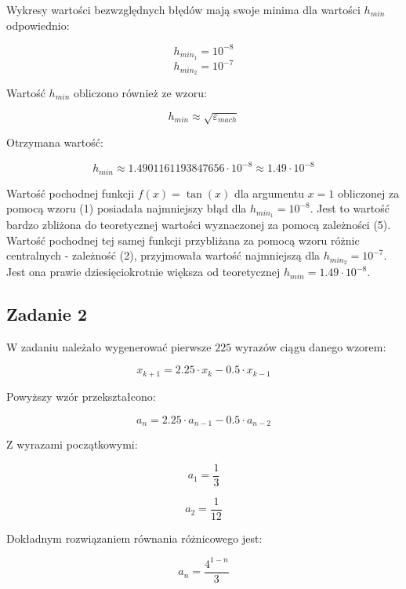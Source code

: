 \documentclass{article}
\begin{document}
	Wykresy wartości bezwzględnych błędów mają swoje minima dla wartości $h_{min}$ odpowiednio:
	
	$$h_{min_1} = 10^{-8}$$
	$$h_{min_2} = 10^{-7}$$
	
	Wartość $h_{min}$ obliczono również ze wzoru:
	
	\begin{equation}
		h_{min} \approx \sqrt{\varepsilon_{mach}}
	\end{equation}
	
	Otrzymana wartość:
	
	$$h_{min} \approx 1.4901161193847656 \cdot 10^{-8} \approx 1.49 \cdot 10^{-8}$$
	
	Wartość pochodnej funkcji $f(x) = \tan (x)$ dla argumentu $x = 1$ obliczonej za pomocą wzoru (1) posiadała najmniejszy błąd dla $h_{min_1} = 10^{-8}$. Jest to wartość bardzo zbliżona do teoretycznej wartości wyznaczonej za pomocą zależności (5). \newline \newline
	Wartość pochodnej tej samej funkcji przybliżana za pomocą wzoru różnic centralnych - zależność (2), przyjmowała wartość najmniejszą dla $h_{min_2} = 10^{-7}$. Jest ona prawie dziesięciokrotnie większa od teoretycznej $h_{min} = 1.49 \cdot 10^{-8}$. 
	
	\newline
	
	
	\subsection*{Zadanie 2}
	
	W zadaniu należało wygenerować pierwsze $225$ wyrazów ciągu danego wzorem:
	
	\begin{equation}
		x_{k+1} = 2.25 \cdot x_k - 0.5 \cdot x_{k-1}	
	\end{equation}
	
	Powyższy wzór przekształcono:
	
	\begin{equation}
		a_n = 2.25 \cdot a_{n-1} - 0.5 \cdot a_{n-2}
	\end{equation}
	
	Z wyrazami początkowymi:
	
	$$a_1 = \frac{1}{3}$$
	
	$$a_2 = \frac{1}{12}$$
	
	Dokładnym rozwiązaniem równania różnicowego jest:
	
	\begin{equation}
		a_n = \frac{4^{1-n}}{3}
	\end{equation}
	
\end{document}
